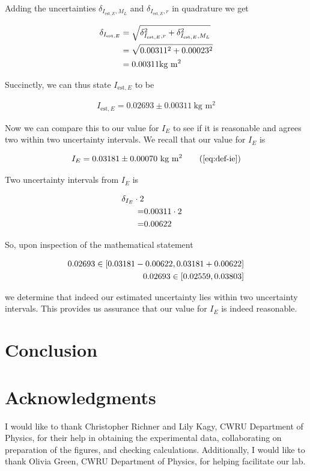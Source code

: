 \documentclass[coverpage]{article}
\newcommand{\iUnit}{\text{kg $\text{m}^2$}}
\begin{document}
	Adding the uncertainties $\delta_{I_{\text{est}, E}, M_L}$ and $\delta_{I_{\text{est}, E}, r}$ in quadrature we get
	
	\begin{align}
		\delta_{I_{\text{est}, E}} &= \sqrt{\delta_{I_{\text{est}, E}, r}^2 + \delta_{I_{\text{est}, E}, M_L}^2} \notag \\
		&= \sqrt{0.00311^2 + 0.00023^2} \notag \\
		&= 0.00311 \iUnit
	\end{align}

	Succinctly, we can thus state $I_{\text{est}, E}$ to be
	
	\begin{align}
		I_{\text{est}, E} = 0.02693 \pm 0.00311\ \iUnit
	\end{align}

	Now we can compare this to our value for $I_E$ to see if it is reasonable and agrees two within two uncertainty intervals. We recall that our value for $I_E$ is
	
	\begin{align}
		I_E = 0.03181 \pm 0.00070\ \iUnit \tag{\ref{eq:def-ie}}
	\end{align} 

	Two uncertainty intervals from $I_E$ is
	
	\begin{align}
		\delta_{I_E} \cdot 2 \notag \\
		=& 0.00311 \cdot 2 \notag \\
		=& 0.00622
	\end{align}

	So, upon inspection of the mathematical statement
	
	\begin{align}
		0.02693 \in [0.03181 - 0.00622, 0.03181 + 0.00622] \notag \\
		0.02693 \in [0.02559, 0.03803] \notag \\
	\end{align}

	we determine that indeed our estimated uncertainty lies within two uncertainty intervals. This provides us assurance that our value for $I_E$ is indeed reasonable. 
	
	\section{Conclusion}
	
	\section*{Acknowledgments}
	I would like to thank Christopher Richner and Lily Kagy, CWRU Department of Physics, for their help in obtaining the experimental data, collaborating on preparation of the figures, and checking calculations. Additionally, I would like to thank Olivia Green, CWRU Department of Physics, for helping facilitate our lab.
	
\end{document}

